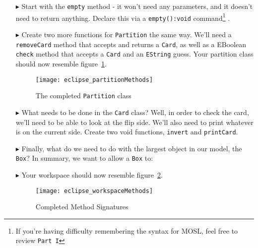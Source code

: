 \begin{itemize}
\item[$\blacktriangleright$] Start with the \texttt{empty} method - it won't need any parameters, and it doesn't need to return anything. Declare this via a \texttt{empty():void} command\footnote{If you're having difficulty remembering the syntax for MOSL, feel free to review \mbox{\texttt{Part I}}} .

\item[$\blacktriangleright$] Create two more functions for \texttt{Partition} the same way. We'll need a \texttt{removeCard} method that accepts and returns a \texttt{Card}, as well as a EBoolean \texttt{check} method that accepts a \texttt{Card} and an \texttt{EString} guess. Your partition class should now resemble figure~\ref{fig:partitionMethods}.

\begin{figure}[htbp]
	\centering
  \texttt{[image: eclipse\_partitionMethods]}
	\caption{The completed \texttt{Partition} class}
	\label{fig:partitionMethods}
\end{figure}

\item[$\blacktriangleright$] What needs to be done in the \texttt{Card} class? Well, in order to check the card, we'll need to be able to look at the flip side. We'll also need to print whatever is on the current side. Create two void functions, \texttt{invert} and \texttt{printCard}.

\pagebreak

\item[$\blacktriangleright$] Finally, what do we need to do with the largest object in our model, the \texttt{Box}? In summary, we want to allow a \texttt{Box} to:



\item[$\blacktriangleright$] Your workspace should now resemble figure~\ref{fig:workspaceMethods}.
\begin{figure}[htbp]
	\centering
  \texttt{[image: eclipse\_workspaceMethods]}
	\caption{Completed Method Signatures}
	\label{fig:workspaceMethods}
\end{figure}



\end{itemize}
